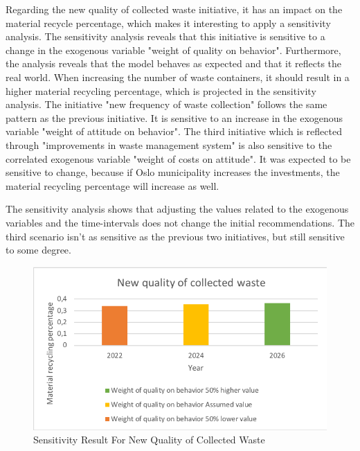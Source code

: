 \indent \newline
Regarding the new quality of collected waste initiative, it has an impact on the material recycle percentage, which makes it interesting to apply a sensitivity analysis. The sensitivity analysis reveals that this initiative is sensitive to a change in the exogenous variable "weight of quality on behavior". Furthermore, the analysis reveals that the model behaves as expected and that it reflects the real world. When increasing the number of waste containers, it should result in a higher material recycling percentage, which is projected in the sensitivity analysis. The initiative "new frequency of waste collection" follows the same pattern as the previous initiative. It is sensitive to an increase in the exogenous variable "weight of attitude on behavior". The third initiative which is reflected through "improvements in waste management system" is also sensitive to the correlated exogenous variable "weight of costs on attitude". It was expected to be sensitive to change, because if Oslo municipality increases the investments, the material recycling percentage will increase as well. 

\indent \newline
The sensitivity analysis shows that adjusting the values related to the exogenous variables and the time-intervals does not change the initial recommendations. The third scenario isn't as sensitive as the previous two initiatives, but still sensitive to some degree. 

\begin{figure}[H]
\centering
\includegraphics [scale=0.80,angle=360]{figures/sensitivitynew.png}
\caption{Sensitivity Result For New Quality of Collected Waste}
\label{fig:sensitivitynew}
\end{figure}

